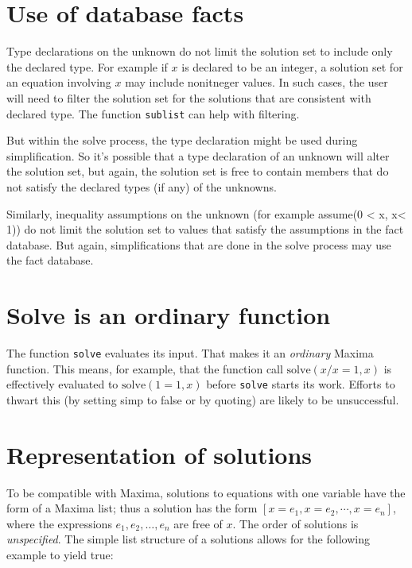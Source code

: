 \documentclass[]{article}%
\newcommand{\solve}{\texttt{solve}}
\begin{document}
\section{Use of database facts}

Type declarations on the unknown do not limit the solution set to include only the declared type. For
example if \(x\) is declared to be an integer, a solution set for an equation involving \(x\) may include
nonitneger values. In such cases, the user will need to filter the solution set for the solutions that are
consistent with declared type. The function \texttt{sublist} can help with filtering.

But within the solve process, the type declaration might be used during simplification. So it's possible
that a type declaration of an unknown will alter the solution set, but again, the solution set is free
to contain members that do not satisfy the declared types (if any) of the unknowns.

Similarly, inequality assumptions on the unknown (for example assume(0 < x, x< 1)) do not limit the solution
set to values that satisfy the assumptions in the fact database. But again, simplifications that are done
in the solve process may use the fact database.


\section{Solve is an ordinary function}

The function \solve \/ evaluates its input. That makes it an \emph{ordinary} Maxima function. This means,
for example, that the function call \(\mathrm{solve}(x/x=1,x)\) is effectively evaluated to
\(\mathrm{solve}(1=1,x)\) before \solve \/ starts its work. Efforts to thwart this (by setting simp to
false or by quoting) are likely to be unsuccessful.

\section{Representation of solutions}

To be compatible with Maxima, solutions to equations with one variable have the form of a Maxima list; thus a solution has the form \([x = e_1, x = e_2, \cdots, x = e_n]\), where the expressions \(e_1, e_2, \dots, e_n\) are free of \(x\). The order of solutions is \emph{unspecified}. The simple list structure of a solutions allows for the following example to yield true:
\end{document}
